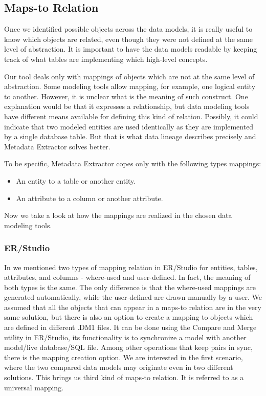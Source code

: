 \subsection{Maps-to Relation}
\label{maps_to_analysis}

Once we identified possible objects across the data models, it is really useful to know which objects are related, even though they were not defined at the same level of abstraction. 
It is important to have the data models readable by keeping track of what tables are implementing which high-level concepts.

Our tool deals only with mappings of objects which are not at the same level of abstraction. 
Some modeling tools allow mapping, for example, one logical entity to another. However, it is unclear what is the meaning of such construct. 
One explanation would be that it expresses a relationship, but data modeling tools have different means available for defining this kind of relation.
Possibly, it could indicate that two modeled entities are used identically as they are implemented by a single database table. But that is what data lineage describes precisely and Metadata Extractor solves better.

To be specific, Metadata Extractor copes only with the following types mappings: 
\begin{itemize}
	\item An entity to a table or another entity. 
	\item An attribute to a column or another attribute.
\end{itemize}
\label{allowed_mappings}

Now we take a look at how the mappings are realized in the chosen data modeling tools.

\subsubsection{ER/Studio}

In  we mentioned two types of mapping relation in ER/Studio for entities, tables, attributes, and columns - where-used and user-defined.
In fact, the meaning of both types is the same. The only difference is that the where-used mappings are generated automatically, while the user-defined are drawn manually by a user. 
We assumed that all the objects that can appear in a maps-to relation are in the very same solution, but there is also an option to create a mapping to objects which are defined in different .DM1 files. It can be done using the Compare and Merge utility in ER/Studio, its functionality is to synchronize a model with another model/live database/SQL file. 
Among other operations that keep pairs in sync, there is the mapping creation option. 
We are interested in the first scenario, where the two compared data models may originate even in two different solutions. 
This brings us third kind of maps-to relation. It is referred to as a universal mapping. \\

